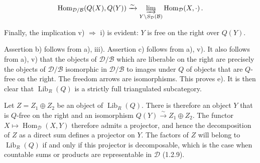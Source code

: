 \[
  \operatorname{Hom}_{\mathcal D/\mathcal B}(Q(X),Q(Y))
  \xrightarrow{\sim}
  \varinjlim_{Y\backslash S_{\mathcal D}(\mathcal B)}
  \operatorname{Hom}_{\mathcal D}(X,\mathord\cdot)\, .
\]

Finally, the implication v) $\Rightarrow$ i) is evident: $Y$ is free on
the right over $Q(Y)$.

Assertion b) follows from a), iii). Assertion c) follows from a), v). It
also follows from a), v) that the objects of $\mathcal D/\mathcal B$ which
are liberable on the right are precisely the objects of
$\mathcal D/\mathcal B$ isomorphic in $\mathcal D/\mathcal B$ to images
under $Q$ of objects that are $Q$-free on the right. The freedom arrows are
isomorphisms. This proves e). It is then clear that
$\operatorname{Lib}_R(Q)$ is a strictly full triangulated subcategory.

Let $Z=Z_1\oplus Z_2$ be an object of $\operatorname{Lib}_R(Q)$. There is
therefore an object $Y$ that is $Q$-free on the right and an isomorphism
$Q(Y)\xrightarrow{\sim}Z_1\oplus Z_2$. The functor
$X\longmapsto\operatorname{Hom}_{\mathcal D}(X,Y)$ therefore admits a
projector, and hence the decomposition of $Z$ as a direct sum defines a
projector on $Y$. The factors of $Z$ will belong to
$\operatorname{Lib}_R(Q)$ if and only if this projector is decomposable,
which is the case when countable sums or products are representable in
$\mathcal D$ (1.2.9).
\endgroup
